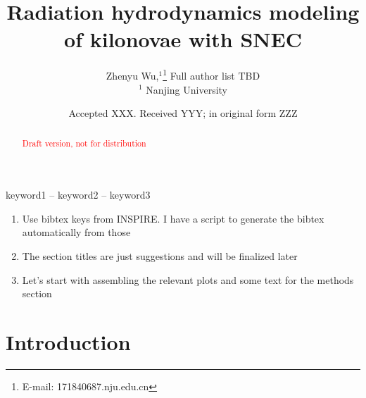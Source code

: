 \documentclass[fleqn,usenatbib]{mnras}
\title[Kilonova modeling with SNEC]{Radiation hydrodynamics modeling of kilonovae with SNEC}
\author[Z.~Wu]{
Zhenyu Wu,$^{1}$\thanks{E-mail: 171840687\@smail.nju.edu.cn}
Full author list TBD
\\
$^{1}$ Nanjing University\\
}
\date{Accepted XXX. Received YYY; in original form ZZZ}
\begin{document}
\label{firstpage}
\pagerange{\pageref{firstpage}--\pageref{lastpage}}
\maketitle

\begin{abstract}
\textcolor{red}{Draft version, not for distribution}
\end{abstract}

\begin{keywords}
keyword1 -- keyword2 -- keyword3
\end{keywords}


\begin{enumerate}
    \item Use bibtex keys from INSPIRE. I have a script to generate the bibtex automatically from those
    \item The section titles are just suggestions and will be finalized later
    \item Let's start with assembling the relevant plots and some text for the methods section
\end{enumerate}

\section{Introduction}

\end{document}
